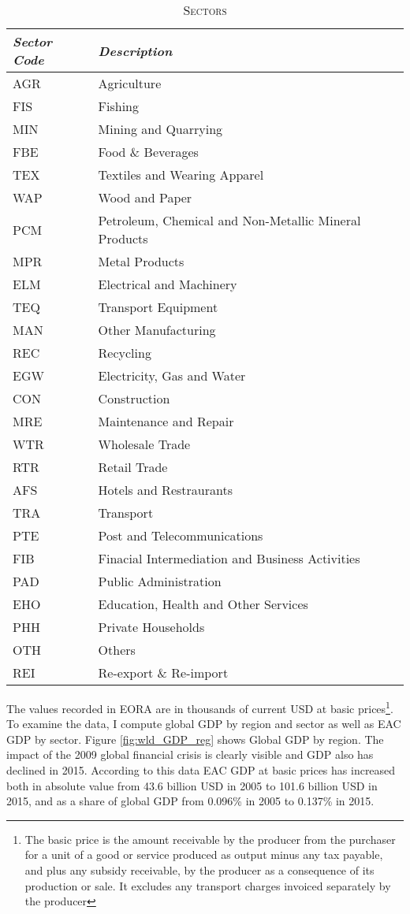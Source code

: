\documentclass[a4paper]{article}
\begin{document}
\begin{table}[h!]
\centering
\caption{\textsc{Sectors}}

\label{tab:sec}
\vspace{2mm}
\begin{tabular}{ll} \toprule
\textit{Sector Code} & \textit{Description} \\ \midrule
AGR & Agriculture \\
 FIS & Fishing \\
 MIN & Mining and Quarrying \\
 FBE & Food \& Beverages \\
 TEX & Textiles and Wearing Apparel \\
 WAP & Wood and Paper \\
 PCM & Petroleum, Chemical and Non-Metallic Mineral Products \\
 MPR & Metal Products \\
 ELM & Electrical and Machinery \\
 TEQ & Transport Equipment \\
 MAN & Other Manufacturing \\
 REC & Recycling \\
 EGW & Electricity, Gas and Water \\
 CON & Construction \\
 MRE & Maintenance and Repair \\
 WTR & Wholesale Trade \\
 RTR & Retail Trade \\
 AFS & Hotels and Restraurants \\
 TRA & Transport \\
 PTE & Post and Telecommunications \\
 FIB & Finacial Intermediation and Business Activities \\
 PAD & Public Administration \\
 EHO & Education, Health and Other Services \\
 PHH & Private Households \\
 OTH & Others \\
 REI & Re-export \& Re-import \\ \bottomrule
\end{tabular}
\end{table}
\FloatBarrier


The values recorded in EORA are in thousands of current USD at basic prices\footnote{The basic price is the amount receivable by the producer from the purchaser for a unit of a good or service produced as output minus any tax payable, and plus any subsidy receivable, by the producer as a consequence of its production or sale. It excludes any transport charges invoiced separately by the producer}. To examine the data, I compute global GDP by region and sector as well as EAC GDP by sector. Figure \ref{fig:wld_GDP_reg} shows Global GDP by region. The impact of the 2009 global financial crisis is clearly visible and GDP also has declined in 2015. %
According to this data EAC GDP at basic prices has increased both in absolute value from 43.6 billion USD in 2005 to 101.6 billion USD in 2015, and as a share of global GDP from 0.096\% in 2005 to 0.137\% in 2015. \newline
\end{document}
